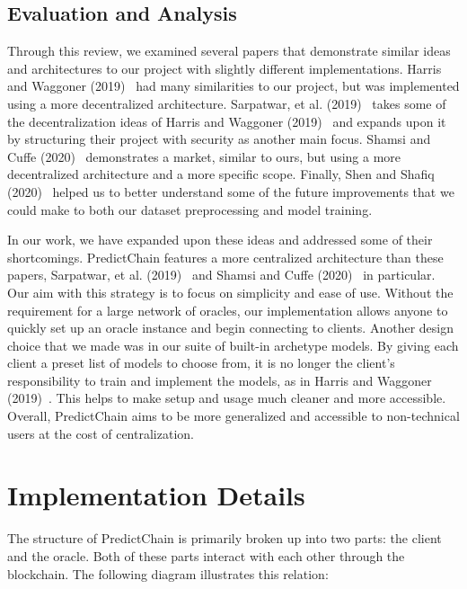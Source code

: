 \documentclass{ledger}
\begin{document}
\subsection{Evaluation and Analysis}

Through this review, we examined several papers that demonstrate similar ideas and architectures to our project
with slightly different implementations.  Harris and Waggoner (2019)~\cite{sharingModels} had many similarities to our
project, but was implemented using a more decentralized architecture.  Sarpatwar, et al. (2019)~\cite{priceOfTrust} takes
some of the decentralization ideas of Harris and Waggoner (2019)~\cite{sharingModels} and expands upon it by structuring
their project with security as another main focus.  Shamsi and Cuffe (2020)~\cite{windForcasting} demonstrates a market,
similar to ours, but using a more decentralized architecture and a more specific scope.  Finally, Shen and Shafiq
(2020)~\cite{deepPrediction} helped us to better understand some of the future improvements that we could make
to both our dataset preprocessing and model training.

In our work, we have expanded upon these ideas and addressed some of their shortcomings.  PredictChain features a more
centralized architecture than these papers, Sarpatwar, et al. (2019)~\cite{priceOfTrust} and Shamsi and Cuffe
(2020)~\cite{windForcasting} in particular. Our aim with this strategy is to focus on simplicity and ease of use.  Without
the requirement for a large network of oracles, our implementation allows anyone to quickly set up an oracle instance and
begin connecting to clients.  Another design choice that we made was in our suite of built-in archetype models.  By giving
each client a preset list of models to choose from, it is no longer the client's responsibility to train and implement
the models, as in Harris and Waggoner (2019)~\cite{sharingModels}.  This helps to make setup and usage much cleaner and
more accessible.  Overall, PredictChain aims to be more generalized and accessible to non-technical users at the cost of centralization.

\section{Implementation Details}

The structure of PredictChain is primarily broken up into two parts: the client and the oracle.  Both of these parts
interact with each other through the blockchain.  The following diagram illustrates this relation:
\end{document}
